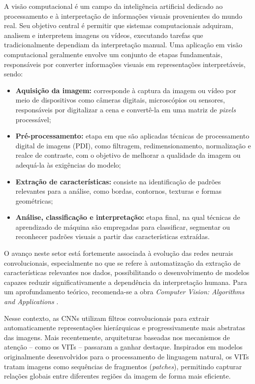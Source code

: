 A visão computacional é um campo da inteligência artificial dedicado ao processamento e à interpretação de informações visuais provenientes do mundo real. Seu objetivo central é permitir que sistemas computacionais adquiram, analisem e interpretem imagens ou vídeos, executando tarefas que tradicionalmente dependiam da interpretação manual. Uma aplicação em visão computacional geralmente envolve um conjunto de etapas fundamentais, responsáveis por converter informações visuais em representações interpretáveis, sendo:
\begin{itemize}

    \item \textbf{Aquisição da imagem:} corresponde à captura da imagem ou vídeo por meio de dispositivos como câmeras digitais, microscópios ou sensores, responsáveis por digitalizar a cena e convertê-la em uma matriz de \textit{pixels} processável;
    
    \item \textbf{Pré-processamento:} etapa em que são aplicadas técnicas de processamento digital de imagens (\acs{PDI}), como filtragem, redimensionamento, normalização e realce de contraste, com o objetivo de melhorar a qualidade da imagem ou adequá-la às exigências do modelo;
    
    \item \textbf{Extração de características:} consiste na identificação de padrões relevantes para a análise, como bordas, contornos, texturas e formas geométricas;
    
    \item \textbf{Análise, classificação e interpretação:} etapa final, na qual técnicas de aprendizado de máquina são empregadas para classificar, segmentar ou reconhecer padrões visuais a partir das características extraídas. 
    
\end{itemize} 

O avanço neste setor está fortemente associada à evolução das redes neurais convolucionais, especialmente no que se refere à automatização da extração de características relevantes nos dados, possibilitando o desenvolvimento de modelos capazes reduzir significativamente a dependência da interpretação humana. Para um aprofundamento teórico, recomenda-se a obra \textit{Computer Vision: Algorithms and Applications} \cite{szeliski2010}.

Nesse contexto, as \acsp{CNN} utilizam filtros convolucionais para extrair automaticamente representações hierárquicas e progressivamente mais abstratas das imagens. Mais recentemente, arquiteturas baseadas nos mecanismos de atenção -- como os \acsp{VIT} -- passaram a ganhar destaque. Inspirados em modelos originalmente desenvolvidos para o processamento de linguagem natural, os \acsp{VIT} tratam imagens como sequências de fragmentos (\textit{patches}), permitindo capturar relações globais entre diferentes regiões da imagem de forma mais eficiente.

